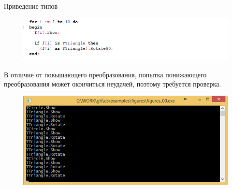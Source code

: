 \documentclass{beamer}
\begin{document}
\begin{frame}{Приведение типов}
\begin{figure}[h]
\centering
\includegraphics[scale=0.5]{images/lec07-pic14.png}
\end{figure}
В отличие от повышающего преобразования, попытка понижающего преобразования может окончиться неудачей, поэтому требуется проверка.
\begin{figure}[h]
\centering
\includegraphics[scale=0.4]{images/lec07-pic15.png}
\end{figure}
\end{frame}
\end{document}
